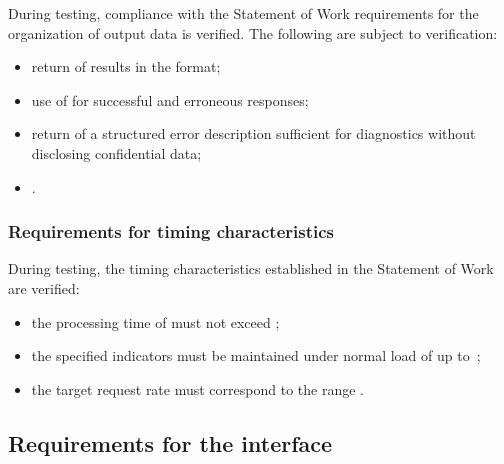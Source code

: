 \documentclass[12pt,a4paper]{extarticle}
\begin{document}
\begin{hseExample}
During testing, compliance with the Statement of Work requirements for the organization of output data is verified. The following are subject to verification:

\begin{itemize}[leftmargin=1.25cm]
    \item return of results in the  format;
    \item use of  for successful and erroneous responses;
    \item return of a structured error description sufficient for diagnostics without disclosing confidential data;
    \item {}.
\end{itemize}
\end{hseExample}

\subsubsection{Requirements for timing characteristics}

\begin{hseExample}
During testing, the timing characteristics established in the Statement of Work are verified:

\begin{itemize}[leftmargin=1.25cm]
    \item the processing time of  must not exceed ;
    \item the specified indicators must be maintained under normal load of up to~;
    \item the target request rate must correspond to the range .
\end{itemize}
\end{hseExample}

\subsection{Requirements for the interface}
\end{document}
